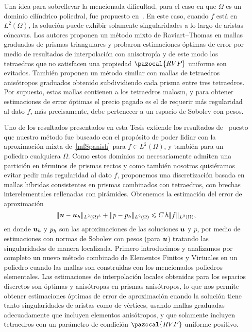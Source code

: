 Una idea para sobrellevar la mencionada dificultad, para
el caso en que $\Omega$ es un dominio cil\'indrico 
poliedral, fue propuesto en~\cite{MR1866274}. En este caso,
cuando $f$ está en $L^2(\Omega)$, la solución puede
exhibir solamente singularidades a lo largo de aristas
cóncavas. Los autores proponen un m\'etodo mixto de 
Raviart--Thomas en mallas graduadas de prismas triangulares
y probaron estimaciones óptimas de error por medio de 
resultados de interpolación con anisotropía y de este modo
los tetraedros que no satisfacen una propiedad 
$\pazocal{RVP}$ uniforme son evitados. Tambi\'en proponen
un m\'etodo similar con mallas de tetraedros anisótropos
 graduados obtenido subdividiendo cada prisma entre tres
 tetraedros. Por supuesto, estas mallas contienen a los 
tetraedros malosm, y para obtener estimaciones
de error óptimas el precio pagado es el de requerir m\'as
regularidad al dato $f$, más precisamente, debe pertenecer
a un espacio de Sobolev con pesos.

Uno de los resultados presentados en esta Tesis extiende
los resultados de~\cite{MR1866274} puesto que nuestro
m\'etodo fue buscado con el propósito de poder
lidiar con la aproximación mixta de~\eqref{mfSpanish}
para $f\in L^2(\Omega)$, y tambi\'en para un poliedro
cualquiera $\Omega$. Como estos dominios no necesariamente
admiten una partición en términos de prismas rectos y como
también nosotros quisiéramos evitar pedir
más regularidad al dato $f$, proponemos una discretización
basada en mallas híbridas consistentes en prismas combinados
con tetraedros, con brechas interelementales rellenadas
con pirámides. Obtenemos la estimación del error de
aproximación
\begin{equation}\label{auxlabel410}
 \|\boldsymbol{u}-\boldsymbol{u}_{\textit h}\|_{L^2(\Omega)^3} + \|p-p_{\textit h}\|_{L^2(\Omega)} 
 \leqslant C\,\textit{h}\|f\|_{L^2(\Omega)}{\mbox{,}}
\end{equation}
en donde $\boldsymbol{u}_{\textit h}$ y $p_{\textit h}$ son las
aproximaciones de las soluciones $\boldsymbol{u}$ y $p$, por medio
de estimaciones con normas de Sobolev con pesos 
(para $\boldsymbol{u}$) tratando las singularidades de manera 
localizada. Primero introducimos y analizamos por completo
un nuevo
método combinado de Elementos Finitos y Virtuales
en un poliedro cuando las mallas son construidas con
los mencionados poliedros elementales. Las estimaciones
de interpolación locales obtenidas 
para los espacios discretos son
óptimas y anisótropas en prismas anisótropos, lo que 
nos permite obtener estimaciones óptimas de error de
aproximación cuando la solución tiene tanto singularidades
de aristas como de vértices, usando
mallas graduadas adecuadamente que incluyen
elementos anisótropos, y que solamente incluyen tetraedros
con un parámetro de condición $\pazocal{RVP}$ uniforme positivo.

